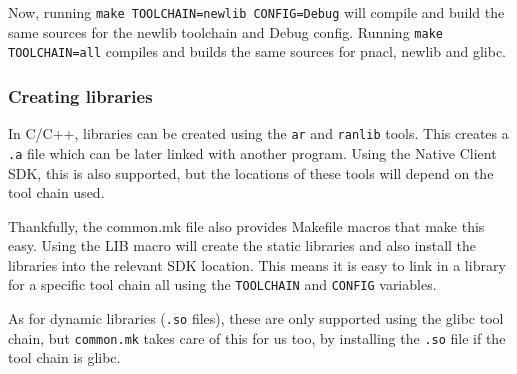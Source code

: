 
Now, running \lstinline+make TOOLCHAIN=newlib CONFIG=Debug+ will compile and build the same sources for the newlib toolchain and Debug config. Running \lstinline+make TOOLCHAIN=all+ compiles and builds the same sources for pnacl, newlib and glibc.


\subsubsection{Creating libraries} %
\label{ssub:creating_libraries}
In C/C++, libraries can be created using the \lstinline+ar+ and \lstinline+ranlib+ tools. This creates a \lstinline+.a+ file which can be later linked with another program. Using the Native Client SDK, this is also supported, but the locations of these tools will depend on the tool chain used.

Thankfully, the common.mk file also provides Makefile macros that make this easy. Using the LIB macro will create the static libraries and also install the libraries into the relevant SDK location. This means it is easy to link in a library for a specific tool chain all using the \lstinline+TOOLCHAIN+ and \lstinline+CONFIG+ variables.

As for dynamic libraries (\lstinline+.so+ files), these are only supported using the glibc tool chain, but \lstinline+common.mk+ takes care of this for us too, by installing the \lstinline+.so+ file if the tool chain is glibc.

